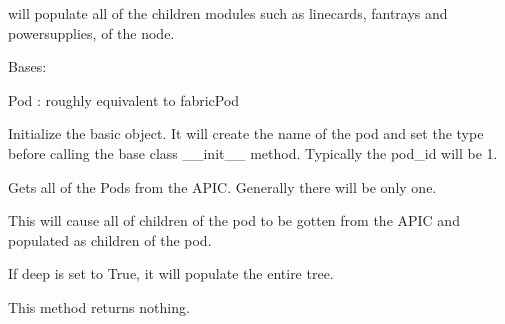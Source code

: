 \documentclass[letterpaper,10pt,english]{sphinxmanual}
\begin{document}
\begin{fulllineitems}
\begin{fulllineitems}
\end{fulllineitems}


\begin{fulllineitems}
\label{aciphysobject:aciphysobject.Node.populate_children}
will populate all of the children modules such as linecards, fantrays and powersupplies, of the node.

\end{fulllineitems}


\end{fulllineitems}


\begin{fulllineitems}
\label{aciphysobject:aciphysobject.Pod}
Bases: {\hyperref[aciphysobject:aciphysobject.BaseACIPhysObject]{}}

Pod :  roughly equivalent to fabricPod

Initialize the basic object.  It will create the name of the pod and set the type
before calling the base class \_\_init\_\_ method.  Typically the pod\_id will be 1.

\begin{fulllineitems}
\label{aciphysobject:aciphysobject.Pod.get}
Gets all of the Pods from the APIC.  Generally there will be only one.

\end{fulllineitems}


\begin{fulllineitems}
\label{aciphysobject:aciphysobject.Pod.populate_children}
This will cause all of children of the pod to be gotten from the APIC and
populated as children of the pod.

If deep is set to True, it will populate the entire tree.

This method returns nothing.

\end{fulllineitems}


\end{fulllineitems}
\end{document}

